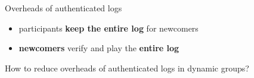 \documentclass[xcolor=table]{beamer}
\begin{document}
\begin{frame}{Overheads of authenticated logs}
\begin{figure}
\end{figure}
    \begin{itemize}
        \item participants \textbf{keep the entire log} for newcomers
        \item<3-> \textbf{newcomers} verify and play the \textbf{entire log}
    \end{itemize}
\end{frame}

\begin{frame}[standout]
    How to reduce overheads of authenticated logs in dynamic groups?
\end{frame}
\end{document}

